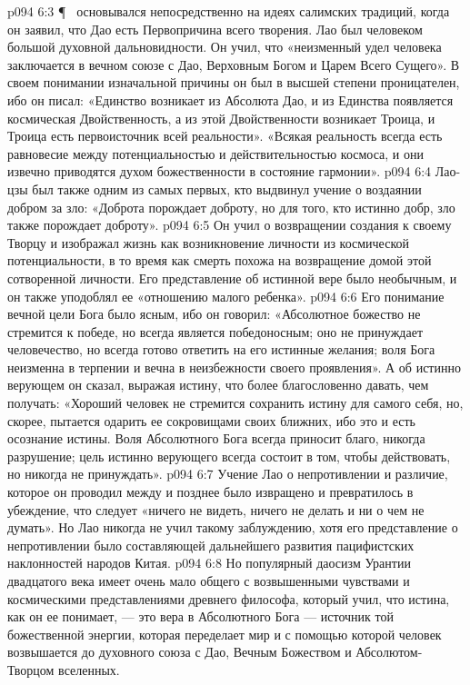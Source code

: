 \vs p094 6:3 \P\  основывался непосредственно на идеях салимских традиций, когда он заявил, что Дао есть Первопричина всего творения. Лао был человеком большой духовной дальновидности. Он учил, что «неизменный удел человека заключается в вечном союзе с Дао, Верховным Богом и Царем Всего Сущего». В своем понимании изначальной причины он был в высшей степени проницателен, ибо он писал: «Единство возникает из Абсолюта Дао, и из Единства появляется космическая Двойственность, а из этой Двойственности возникает Троица, и Троица есть первоисточник всей реальности». «Всякая реальность всегда есть равновесие между потенциальностью и действительностью космоса, и они извечно приводятся духом божественности в состояние гармонии».
\vs p094 6:4 Лао\hyp{}цзы был также одним из самых первых, кто выдвинул учение о воздаянии добром за зло: «Доброта порождает доброту, но для того, кто истинно добр, зло также порождает доброту».
\vs p094 6:5 Он учил о возвращении создания к своему Творцу и изображал жизнь как возникновение личности из космической потенциальности, в то время как смерть похожа на возвращение домой этой сотворенной личности. Его представление об истинной вере было необычным, и он также уподоблял ее «отношению малого ребенка».
\vs p094 6:6 Его понимание вечной цели Бога было ясным, ибо он говорил: «Абсолютное божество не стремится к победе, но всегда является победоносным; оно не принуждает человечество, но всегда готово ответить на его истинные желания; воля Бога неизменна в терпении и вечна в неизбежности своего проявления». А об истинно верующем он сказал, выражая истину, что более благословенно давать, чем получать: «Хороший человек не стремится сохранить истину для самого себя, но, скорее, пытается одарить ее сокровищами своих ближних, ибо это и есть осознание истины. Воля Абсолютного Бога всегда приносит благо, никогда разрушение; цель истинно верующего всегда состоит в том, чтобы действовать, но никогда не принуждать».
\vs p094 6:7 Учение Лао о непротивлении и различие, которое он проводил между  и  позднее было извращено и превратилось в убеждение, что следует «ничего не видеть, ничего не делать и ни о чем не думать». Но Лао никогда не учил такому заблуждению, хотя его представление о непротивлении было составляющей дальнейшего развития пацифистских наклонностей народов Китая.
\vs p094 6:8 Но популярный даосизм Урантии двадцатого века имеет очень мало общего с возвышенными чувствами и космическими представлениями древнего философа, который учил, что истина, как он ее понимает, --- это вера в Абсолютного Бога --- источник той божественной энергии, которая переделает мир и с помощью которой человек возвышается до духовного союза с Дао, Вечным Божеством и Абсолютом\hyp{}Творцом вселенных.

